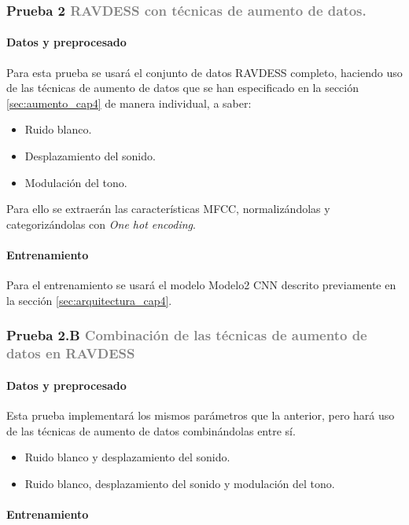 \documentclass[11pt,a4paper,spanish]{book}
\begin{document}
	\subsubsection[]{\large Prueba 2  {\normalsize \textcolor{Gray}{RAVDESS con técnicas de aumento de datos.}}}
	\hfill\begin{minipage}{\dimexpr\textwidth-1cm}
		
		\paragraph{Datos y preprocesado}Para esta prueba se usará el conjunto de datos RAVDESS completo, haciendo uso de las técnicas de aumento de datos que se han especificado en la sección \ref{sec:aumento_cap4} de manera individual, a saber:
		\begin{itemize}
			\item Ruido blanco.
			\item Desplazamiento del sonido.
			\item Modulación del tono.
		\end{itemize}
		Para ello se extraerán las características MFCC, normalizándolas y categorizándolas con \emph{One hot encoding}.
		\paragraph{Entrenamiento}Para el entrenamiento se usará el modelo Modelo2 CNN descrito previamente en la sección \ref{sec:arquitectura_cap4}.
		
	\end{minipage}
	
	
	\subsubsection[]{\large Prueba 2.B {\normalsize \textcolor{Gray}{Combinación de las técnicas de aumento de datos en RAVDESS}}}
	
	\hfill\begin{minipage}{\dimexpr\textwidth-1cm}
		\paragraph{Datos y preprocesado}Esta prueba implementará los mismos parámetros que la anterior, pero hará uso de las técnicas de aumento de datos combinándolas entre sí.
		\begin{itemize}
			\item Ruido blanco y desplazamiento del sonido.
			\item Ruido blanco, desplazamiento del sonido y modulación del tono.
		\end{itemize}
		\paragraph{Entrenamiento}
	\end{minipage}
\end{document}
